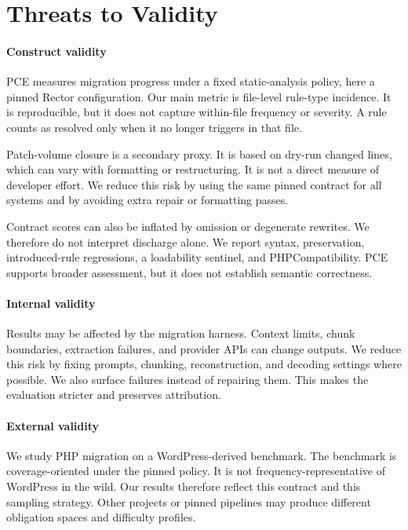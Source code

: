\documentclass[a4paper,UKenglish,cleveref,autoref]{styles/LIPIcs/authors/lipics-v2021}%
\begin{document}
\section{Threats to Validity}
\label{sec:threats}

\paragraph*{Construct validity}\par
PCE measures migration progress under a fixed static-analysis policy, here a pinned Rector configuration. Our main metric is file-level rule-type incidence. It is reproducible, but it does not capture within-file frequency or severity. A rule counts as resolved only when it no longer triggers in that file.

Patch-volume closure is a secondary proxy. It is based on dry-run changed lines, which can vary with formatting or restructuring. It is not a direct measure of developer effort. We reduce this risk by using the same pinned contract for all systems and by avoiding extra repair or formatting passes.

Contract scores can also be inflated by omission or degenerate rewrites. We therefore do not interpret discharge alone. We report syntax, preservation, introduced-rule regressions, a loadability sentinel, and PHPCompatibility. PCE supports broader assessment, but it does not establish semantic correctness.

\paragraph*{Internal validity}
Results may be affected by the migration harness. Context limits, chunk boundaries, extraction failures, and provider APIs can change outputs. We reduce this risk by fixing prompts, chunking, reconstruction, and decoding settings where possible. We also surface failures instead of repairing them. This makes the evaluation stricter and preserves attribution.

\paragraph*{External validity}
We study PHP migration on a WordPress-derived benchmark. The benchmark is coverage-oriented under the pinned policy. It is not frequency-representative of WordPress in the wild. Our results therefore reflect this contract and this sampling strategy. Other projects or pinned pipelines may produce different obligation spaces and difficulty profiles.
\end{document}
